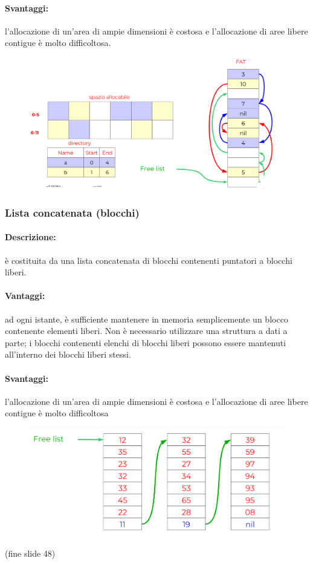 \paragraph{Svantaggi:} l’allocazione di un’area di ampie dimensioni è costosa e l’allocazione di aree libere contigue è molto difficoltosa.
\begin{figure} [h]
    \centering
    \includegraphics[width=0.7\linewidth]{Images/Screenshot 2025-01-18 at 17-00-54 so-07-filesystem.pdf.png}
\end{figure}

\subsubsection{Lista concatenata (blocchi)}

\paragraph{Descrizione:} è costituita da una lista concatenata di blocchi contenenti puntatori a blocchi liberi.

\paragraph{Vantaggi:} ad ogni istante, è sufficiente mantenere in memoria semplicemente un blocco contenente elementi liberi.
Non è necessario utilizzare una struttura a dati a parte; i blocchi contenenti elenchi di blocchi liberi possono essere
mantenuti all'interno dei blocchi liberi stessi.
\paragraph{Svantaggi:} l’allocazione di un’area di ampie dimensioni è costosa e l’allocazione di aree libere contigue è molto difficoltosa

\begin{figure} [h]
    \centering
    \includegraphics[width=0.7\linewidth]{Images/Screenshot 2025-01-18 at 17-02-36 so-07-filesystem.pdf.png}
\end{figure}

(fine slide 48)